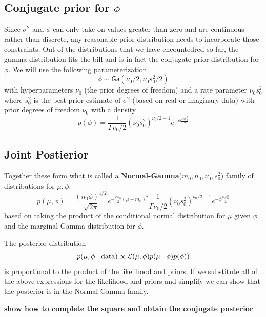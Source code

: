 \documentclass[11pt]{article}
\def\Ga{\textsf{Ga}}
\def\data{\text{data}}
\begin{document}
\subsection*{Conjugate prior for $\phi$}
Since $\sigma^2$ and $\phi$ can only take on values greater than zero and are continuous rather than discrete,  any reasonable prior distribution needs to incorporate those constraints.  Out of the distributions that we have encountedred so far, the gamma distribution fits the bill and is in fact the conjugate prior distribution for $\phi$.  We will use the following parameterization
$$
\phi \sim \Ga(\nu_0/2, \nu_0 s^2_0/2)
$$
with hyperparameters  $\nu_0$ (the prior degrees of freedom) and a rate parameter $\nu_0 s^2_0$ where $s^2_0$ is the best prior estimate of $\sigma^2$  (based on real or imaginary data) with prior degrees of freedom $\nu_0$ with a density
$$p(\phi) = \frac{1}{\Gamma{\nu_0/2}} (\nu_0 s^2_0 )^{\nu_0/2 -1} e^{- \phi \frac{\nu_0 s^2_0} {2}}
$$

\subsection*{Joint Postierior}
Together these form what is called a {\bf Normal-Gamma}($m_0, n_0, \nu_0, s^2_0$) family of distributions for $\mu, \phi$:
$$
p(\mu, \phi) = \frac{(n_0 \phi)^{1/2}} {\sqrt{2\pi}} e^{- \frac{\phi n_0}{2} (\mu -m_0)^2} \frac{1}{\Gamma{\nu_0/2}} (\nu_0 s^2_0 )^{\nu_0/2 -1} e^{- \phi \frac{\nu_0 s^2_0} {2}}
$$
based on taking the product of the conditional normal distribution for $\mu$ given $\phi$ and the marginal Gamma  distribution for $\phi$.

The posterior distribution 
$$
p(\mu, \phi \mid \data) \propto {\cal{L}}(\mu, \phi) p(\mu \mid \phi) p(\phi)
)
$$
is proportional to the product of the likelihood and priors.
If we substitute all of the above expressions for the likelihood and priors and simplify we can show that the posterior is in the Normal-Gamma family.

{\bf show how to complete the square and obtain the conjugate posterior}
\end{document}
